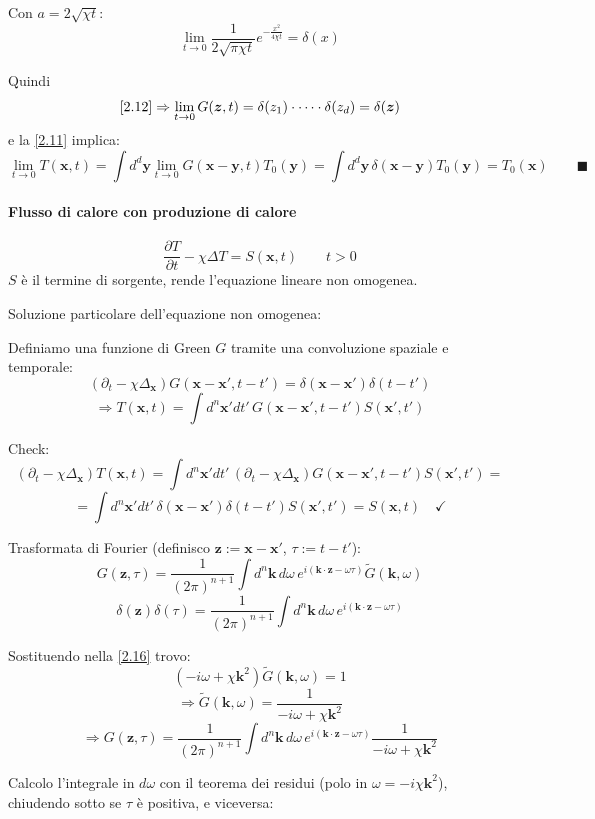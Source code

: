\documentclass[a4paper,11pt]{report}
\newcommand{\x}{\boldsymbol{x}}
\newcommand{\y}{\boldsymbol{y}}
\newcommand{\kk}{\boldsymbol{k}}
\newcommand{\z}{\boldsymbol{z}}
\begin{document}
Con $a=2\sqrt{\chi t}:$
\begin{equation}
\lim_{t \to 0}\frac{1}{2\sqrt{\pi\chi t}}e^{-\frac{x^2}{4\chi t}}=\delta(x)
\end{equation}

Quindi
\[
\eqref{2.12}\Rightarrow\lim_{t\to 0} G(\z,t)=\delta(z_1)\cdot\dots\cdot\delta(z_d)=\delta(\z)
\]
e la \eqref{2.11} implica:
\[
\lim_{t\to 0}T(\x,t)=\int d^d\y \lim_{t\to 0}G(\x-\y,t)T_0(\y)=\int d^d \y\,\delta(\x-\y)T_0(\y)=T_0(\x) \qquad \blacksquare
\]

\paragraph{Flusso di calore con produzione di calore}
\[
\frac{\partial T}{\partial t} -\chi\Delta T=S(\x,t) \qquad t>0
\]
$S$ \`e il termine di sorgente, rende l'equazione lineare non omogenea.

\medskip

Soluzione particolare dell'equazione non omogenea:

Definiamo una funzione di Green $G$ tramite una convoluzione spaziale e temporale:
\begin{equation}
\left(\partial_t-\chi\Delta_{\x}\right)G(\x-\x', t-t')=\delta(\x-\x')\delta(t-t')
\label{2.16}
\end{equation}
\begin{equation}
\Rightarrow T(\x,t)=\int d^n\x'dt'\,G(\x-\x', t-t')S(\x', t')
\label{2.17}
\end{equation}

Check: 
\[
(\partial_t-\chi\Delta_{\x})T(\x,t)=\int d^n\x'dt'\,(\partial_t-\chi\Delta_{\x})G(\x-\x',t-t')S(\x',t')=
\]
\[
=\int d^n\x'dt' \,\delta(\x-\x')\delta(t-t') S(\x',t')=S(\x,t) \quad \checkmark
\]

Trasformata di Fourier (definisco $\z:=\x-\x'$, $\tau := t-t'$):
\[
G(\z,\tau)=\frac{1}{(2\pi)^{n+1}}\int d^n\kk\, d\omega \, e^{i(\kk\cdot \z-\omega\tau)}\tilde{G}(\kk ,\omega)
\]
\[
\delta(\z)\delta(\tau)=\frac{1}{(2\pi)^{n+1}}\int d^n\kk\, d\omega \, e^{i(\kk\cdot \z-\omega\tau)}
\]

Sostituendo nella \eqref{2.16} trovo:
\[
(-i\omega+\chi\kk ^2)\tilde{G}(\kk ,\omega)=1
\]
\[
\Rightarrow\tilde{G}(\kk ,\omega)=\frac{1}{-i\omega+\chi\kk ^2}
\]
\[
\Rightarrow G(\z,\tau)=\frac{1}{(2\pi)^{n+1}}\int d^n\kk\, d\omega \, e^{i(\kk\cdot \z-\omega\tau)}\frac{1}{-i\omega+\chi\kk ^2}
\]

Calcolo l'integrale in $d\omega$ con il teorema dei residui (polo in $\omega=-i\chi \kk^2$), chiudendo sotto se $\tau$ \`e positiva, e viceversa:
\end{document}
